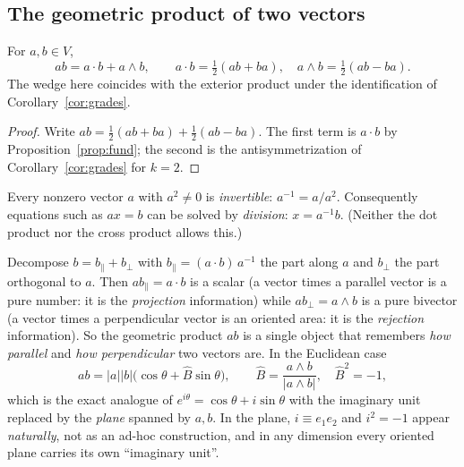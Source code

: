 \subsection{The geometric product of two vectors}

\begin{proposition}\label{prop:abdecomp}
For $a,b\in V$,
\begin{equation}\label{eq:abdecomp}
 ab=a\cdot b+a\wedge b,\qquad a\cdot b=\tfrac12(ab+ba),\quad a\wedge b=\tfrac12(ab-ba).
\end{equation}
The wedge here coincides with the exterior product under the identification of Corollary~\ref{cor:grades}.
\end{proposition}
\begin{proof}
Write $ab=\tfrac12(ab+ba)+\tfrac12(ab-ba)$. The first term is $a\cdot b$ by Proposition~\ref{prop:fund}; the second is the antisymmetrization of Corollary~\ref{cor:grades} for $k=2$.
\end{proof}

Every nonzero vector $a$ with $a^2\neq0$ is \emph{invertible}: $a^{-1}=a/a^2$. Consequently equations such as $ax=b$ can be solved by \emph{division}: $x=a^{-1}b$. (Neither the dot product nor the cross product allows this.)

\begin{intuition}
Decompose $b=b_\parallel+b_\perp$ with $b_\parallel=(a\cdot b)\,a^{-1}$ the part along $a$ and $b_\perp$ the part orthogonal to $a$.
Then $ab_\parallel=a\cdot b$ is a scalar (a vector times a parallel vector is a pure number: it is the \emph{projection} information) while
$ab_\perp=a\wedge b$ is a pure bivector (a vector times a perpendicular vector is an oriented area: it is the \emph{rejection} information).
So the geometric product $ab$ is a single object that remembers \emph{how parallel} and \emph{how perpendicular} two vectors are.
In the Euclidean case
\[
 ab=|a||b|\bigl(\cos\theta+\hat B\sin\theta\bigr),\qquad \hat B=\frac{a\wedge b}{|a\wedge b|},\quad \hat B^2=-1,
\]
which is the exact analogue of $e^{i\theta}=\cos\theta+i\sin\theta$ with the imaginary unit replaced by the \emph{plane} spanned by $a,b$.
In the plane, $i\equiv e_1e_2$ and $i^2=-1$ appear \emph{naturally}, not as an ad-hoc construction, and in any dimension every oriented plane carries its own ``imaginary unit''.
\end{intuition}
